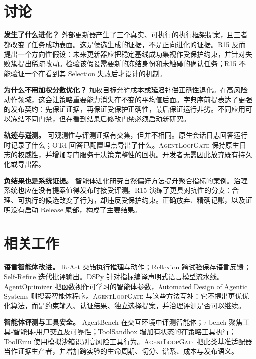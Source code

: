 \documentclass[UTF8,10pt,twocolumn,fontset=none]{ctexart}
\newcommand{\system}{\textsc{AgentLoopGate}\xspace}
\newcommand{\leadparagraph}[1]{\par\vspace{0.6ex}\noindent\textbf{#1}\hspace{0.75em}\ignorespaces}
\begin{document}
\section{讨论}

\leadparagraph{发生了什么进化？}
外部更新器产生了三个真实、可执行的执行框架提案，且三者都改变了任务成功表面。这是候选生成的证据，不是正向进化的证据。R15 反而提出一个方向性假设：未来更新器应把稳定基线成功集视作受保护约束，并针对失败簇提出稀疏改动。检验该假设需要新的冻结身份和未触碰的确认任务；R15 不能验证一个在看到其 Selection 失败后才设计的机制。

\leadparagraph{为什么不用加权分数优化？}
加权目标允许成本或延迟补偿正确性退化。在高风险动作领域，这会让策略重要能力消失在不变的平均值后面。字典序前提表达了更强的发布契约：先保证证据，再保证受保护正确性，最后保证运行非劣。不同应用可以冻结不同门禁，但在看到结果后修改门禁必须启动新研究。

\leadparagraph{轨迹与遥测。}
可观测性与评测证据有交集，但并不相同。原生会话日志回答运行时记录了什么；OTel 回答已配置埋点导出了什么。\system 保持原生日志的权威性，并增加专门服务于决策完整性的回执。开发者无需因此放弃既有持久化或导出器。

\leadparagraph{负结果也是系统证据。}
智能体进化研究自然偏好方法提升聚合指标的案例。治理系统也应在没有提案值得发布时接受评测。R15 演练了更具对抗性的分支：合理、可执行的候选改变了行为，却违反受保护约束。正确放弃、精确记账，以及证明没有启动 Release 尾部，构成了主要结果。

\section{相关工作}

\leadparagraph{语言智能体改进。}
ReAct 交错执行推理与动作\cite{yao2023react}；Reflexion 跨试验保存语言反馈\cite{shinn2023reflexion}；Self-Refine 迭代批评输出\cite{madaan2023selfrefine}。DSPy 针对指标编译声明式语言模型流水线\cite{khattab2023dspy}。AgentOptimizer 把函数视作可学习的智能体参数\cite{zhang2024agentoptimizer}，Automated Design of Agentic Systems 则搜索智能体程序\cite{hu2024adas}。\system 与这些方法互补：它不提出更优优化算法，而是约束输入、认证结果、独立选择提案，并治理评测是否可以继续。

\leadparagraph{智能体评测与工具安全。}
AgentBench 在交互环境中评测智能体\cite{liu2023agentbench}；$\tau$-bench 聚焦工具-智能体-用户交互及可靠性\cite{yao2024taubench}；ToolSandbox 增加有状态的在策略工具执行\cite{lu2024toolsandbox}；ToolEmu 使用模拟沙箱识别高风险工具行为\cite{ruan2023toolemu}。\system 把此类基准适配器当作证据生产者，并增加跨实验的生命周期、切分、谱系、成本与发布语义。
\end{document}
